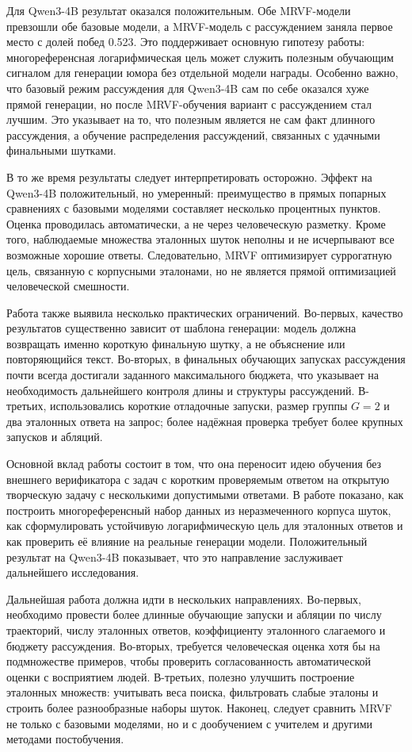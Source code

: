 Для Qwen3-4B результат оказался положительным. Обе MRVF-модели превзошли обе базовые модели, а MRVF-модель с рассуждением заняла первое место с долей побед 0.523. Это поддерживает основную гипотезу работы: многореференсная логарифмическая цель может служить полезным обучающим сигналом для генерации юмора без отдельной модели награды. Особенно важно, что базовый режим рассуждения для Qwen3-4B сам по себе оказался хуже прямой генерации, но после MRVF-обучения вариант с рассуждением стал лучшим. Это указывает на то, что полезным является не сам факт длинного рассуждения, а обучение распределения рассуждений, связанных с удачными финальными шутками.

В то же время результаты следует интерпретировать осторожно. Эффект на Qwen3-4B положительный, но умеренный: преимущество в прямых попарных сравнениях с базовыми моделями составляет несколько процентных пунктов. Оценка проводилась автоматически, а не через человеческую разметку. Кроме того, наблюдаемые множества эталонных шуток неполны и не исчерпывают все возможные хорошие ответы. Следовательно, MRVF оптимизирует суррогатную цель, связанную с корпусными эталонами, но не является прямой оптимизацией человеческой смешности.

Работа также выявила несколько практических ограничений. Во-первых, качество результатов существенно зависит от шаблона генерации: модель должна возвращать именно короткую финальную шутку, а не объяснение или повторяющийся текст. Во-вторых, в финальных обучающих запусках рассуждения почти всегда достигали заданного максимального бюджета, что указывает на необходимость дальнейшего контроля длины и структуры рассуждений. В-третьих, использовались короткие отладочные запуски, размер группы \(G=2\) и два эталонных ответа на запрос; более надёжная проверка требует более крупных запусков и абляций.

Основной вклад работы состоит в том, что она переносит идею обучения без внешнего верификатора с задач с коротким проверяемым ответом на открытую творческую задачу с несколькими допустимыми ответами. В работе показано, как построить многореференсный набор данных из неразмеченного корпуса шуток, как сформулировать устойчивую логарифмическую цель для эталонных ответов и как проверить её влияние на реальные генерации модели. Положительный результат на Qwen3-4B показывает, что это направление заслуживает дальнейшего исследования.

Дальнейшая работа должна идти в нескольких направлениях. Во-первых, необходимо провести более длинные обучающие запуски и абляции по числу траекторий, числу эталонных ответов, коэффициенту эталонного слагаемого и бюджету рассуждения. Во-вторых, требуется человеческая оценка хотя бы на подмножестве примеров, чтобы проверить согласованность автоматической оценки с восприятием людей. В-третьих, полезно улучшить построение эталонных множеств: учитывать веса поиска, фильтровать слабые эталоны и строить более разнообразные наборы шуток. Наконец, следует сравнить MRVF не только с базовыми моделями, но и с дообучением с учителем и другими методами постобучения.